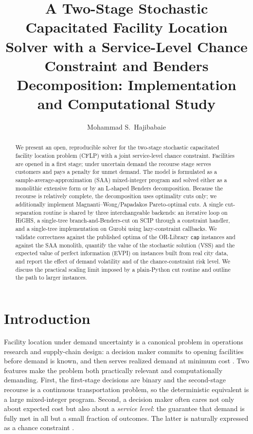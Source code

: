 \documentclass[11pt]{article}
\title{A Two-Stage Stochastic Capacitated Facility Location Solver with a
Service-Level Chance Constraint and Benders Decomposition:
Implementation and Computational Study}
\author{Mohammad S.\ Hajibabaie}
\date{}
\begin{document}
\maketitle

\begin{abstract}
We present an open, reproducible solver for the two-stage stochastic capacitated
facility location problem (CFLP) with a joint service-level chance constraint.
Facilities are opened in a first stage; under uncertain demand the recourse stage
serves customers and pays a penalty for unmet demand. The model is formulated as a
sample-average-approximation (SAA) mixed-integer program and solved either as a
monolithic extensive form or by an L-shaped Benders decomposition. Because the
recourse is relatively complete, the decomposition uses optimality cuts only; we
additionally implement Magnanti--Wong/Papadakos Pareto-optimal cuts. A single
cut-separation routine is shared by three interchangeable backends: an iterative
loop on HiGHS, a single-tree branch-and-Benders-cut on SCIP through a constraint
handler, and a single-tree implementation on Gurobi using lazy-constraint
callbacks. We validate correctness against the published optima of the OR-Library
\texttt{cap} instances and against the SAA monolith, quantify the value of the
stochastic solution (VSS) and the expected value of perfect information (EVPI) on
instances built from real city data, and report the effect of demand volatility
and of the chance-constraint risk level. We discuss the practical scaling limit
imposed by a plain-Python cut routine and outline the path to larger instances.
\end{abstract}

\section{Introduction}
\label{sec:intro}

Facility location under demand uncertainty is a canonical problem in operations
research and supply-chain design: a decision maker commits to opening facilities
before demand is known, and then serves realized demand at minimum cost
\citep{santoso2005,birge2011}. Two features make the problem both practically
relevant and computationally demanding. First, the first-stage decisions are
binary and the second-stage recourse is a continuous transportation problem, so
the deterministic equivalent is a large mixed-integer program. Second, a decision
maker often cares not only about expected cost but also about a \emph{service
level}: the guarantee that demand is fully met in all but a small fraction of
outcomes. The latter is naturally expressed as a chance constraint
\citep{luedtke2008,pagnoncelli2009}.
\end{document}

